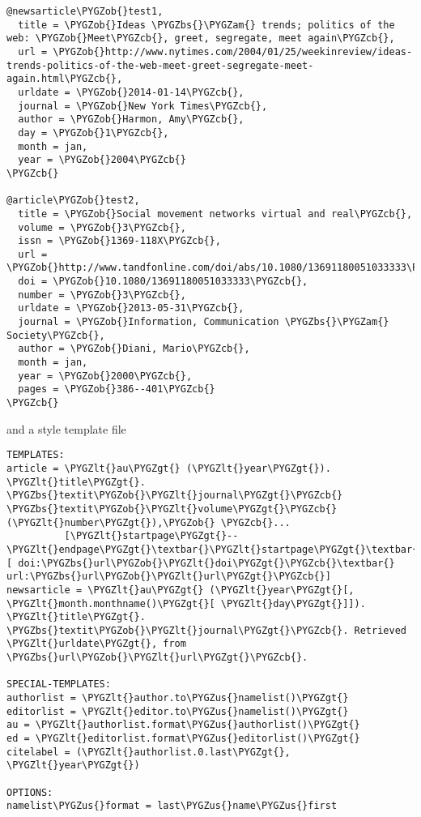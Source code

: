 \documentclass[letterpaper,10pt,english]{sphinxmanual}
\def\PYGZbs{\char`\\}
\def\PYGZus{\char`\_}
\def\PYGZob{\char`\{}
\def\PYGZcb{\char`\}}
\def\PYGZam{\char`\&}
\def\PYGZlt{\char`\<}
\def\PYGZgt{\char`\>}
\begin{document}
\begin{Verbatim}[commandchars=\\\{\}]
@newsarticle\PYGZob{}test1,
  title = \PYGZob{}Ideas \PYGZbs{}\PYGZam{} trends; politics of the web: \PYGZob{}Meet\PYGZcb{}, greet, segregate, meet again\PYGZcb{},
  url = \PYGZob{}http://www.nytimes.com/2004/01/25/weekinreview/ideas-trends-politics-of-the-web-meet-greet-segregate-meet-again.html\PYGZcb{},
  urldate = \PYGZob{}2014-01-14\PYGZcb{},
  journal = \PYGZob{}New York Times\PYGZcb{},
  author = \PYGZob{}Harmon, Amy\PYGZcb{},
  day = \PYGZob{}1\PYGZcb{},
  month = jan,
  year = \PYGZob{}2004\PYGZcb{}
\PYGZcb{}

@article\PYGZob{}test2,
  title = \PYGZob{}Social movement networks virtual and real\PYGZcb{},
  volume = \PYGZob{}3\PYGZcb{},
  issn = \PYGZob{}1369-118X\PYGZcb{},
  url = \PYGZob{}http://www.tandfonline.com/doi/abs/10.1080/13691180051033333\PYGZcb{},
  doi = \PYGZob{}10.1080/13691180051033333\PYGZcb{},
  number = \PYGZob{}3\PYGZcb{},
  urldate = \PYGZob{}2013-05-31\PYGZcb{},
  journal = \PYGZob{}Information, Communication \PYGZbs{}\PYGZam{} Society\PYGZcb{},
  author = \PYGZob{}Diani, Mario\PYGZcb{},
  month = jan,
  year = \PYGZob{}2000\PYGZcb{},
  pages = \PYGZob{}386--401\PYGZcb{}
\PYGZcb{}
\end{Verbatim}

and a style template file

\begin{Verbatim}[commandchars=\\\{\}]
TEMPLATES:
article = \PYGZlt{}au\PYGZgt{} (\PYGZlt{}year\PYGZgt{}). \PYGZlt{}title\PYGZgt{}. \PYGZbs{}textit\PYGZob{}\PYGZlt{}journal\PYGZgt{}\PYGZcb{} \PYGZbs{}textit\PYGZob{}\PYGZlt{}volume\PYGZgt{}\PYGZcb{}(\PYGZlt{}number\PYGZgt{}),\PYGZob{} \PYGZcb{}...
          [\PYGZlt{}startpage\PYGZgt{}--\PYGZlt{}endpage\PYGZgt{}\textbar{}\PYGZlt{}startpage\PYGZgt{}\textbar{}\PYGZlt{}eid\PYGZgt{}\textbar{}].[ doi:\PYGZbs{}url\PYGZob{}\PYGZlt{}doi\PYGZgt{}\PYGZcb{}\textbar{} url:\PYGZbs{}url\PYGZob{}\PYGZlt{}url\PYGZgt{}\PYGZcb{}]
newsarticle = \PYGZlt{}au\PYGZgt{} (\PYGZlt{}year\PYGZgt{}[, \PYGZlt{}month.monthname()\PYGZgt{}[ \PYGZlt{}day\PYGZgt{}]]). \PYGZlt{}title\PYGZgt{}. \PYGZbs{}textit\PYGZob{}\PYGZlt{}journal\PYGZgt{}\PYGZcb{}. Retrieved \PYGZlt{}urldate\PYGZgt{}, from \PYGZbs{}url\PYGZob{}\PYGZlt{}url\PYGZgt{}\PYGZcb{}.

SPECIAL-TEMPLATES:
authorlist = \PYGZlt{}author.to\PYGZus{}namelist()\PYGZgt{}
editorlist = \PYGZlt{}editor.to\PYGZus{}namelist()\PYGZgt{}
au = \PYGZlt{}authorlist.format\PYGZus{}authorlist()\PYGZgt{}
ed = \PYGZlt{}editorlist.format\PYGZus{}editorlist()\PYGZgt{}
citelabel = (\PYGZlt{}authorlist.0.last\PYGZgt{}, \PYGZlt{}year\PYGZgt{})

OPTIONS:
namelist\PYGZus{}format = last\PYGZus{}name\PYGZus{}first
\end{Verbatim}
\end{document}
